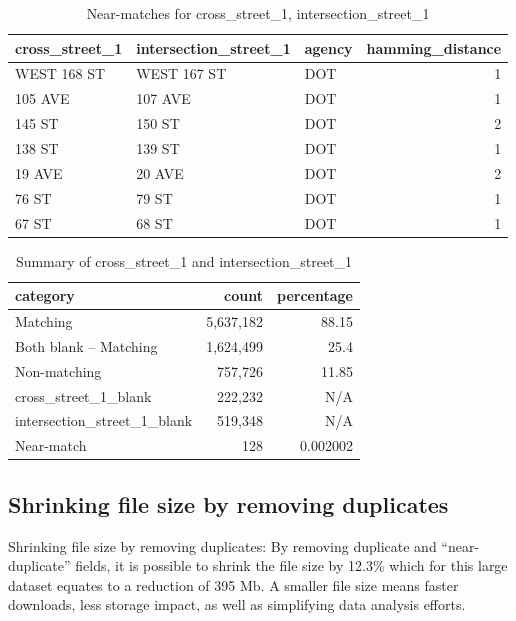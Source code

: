 \documentclass[12pt, titlepage]{article}
\begin{document}
\begin{table}[tbp]
    \centering
     \caption{Near-matches for cross\_street\_1, intersection\_street\_1}
     \label{tab:x1nearmatches}
		\begin{tabular}{l l l r}
	        \toprule
	        \textbf{cross\_street\_1} & \textbf{intersection\_street\_1} 
	        & \textbf{agency} & \textbf{hamming\_distance} \\
	        \midrule
	        WEST 168 ST    & WEST 167 ST           & DOT    & 1 \\
	        105 AVE        & 107 AVE               & DOT    & 1 \\
	        145 ST         & 150 ST                & DOT    & 2 \\
	        138 ST         & 139 ST                & DOT    & 1 \\
	        19 AVE         & 20 AVE                & DOT    & 2 \\
	        76 ST          & 79 ST                 & DOT    & 1 \\
	        67 ST          & 68 ST                 & DOT    & 1 \\
	        \bottomrule
	    \end{tabular}
\end{table}

\begin{table}[tbp]
    \centering
    \caption{Summary of cross\_street\_1 and intersection\_street\_1}
    \label{tab:summary1}
	    \begin{tabular}{l r r}
	        \toprule
	        \textbf{category} & \textbf{count} & \textbf{percentage} \\
	        \midrule
	        Matching                    & 5,637,182 & 88.15     \\
	        Both blank -- Matching      & 1,624,499 & 25.4      \\
	        Non-matching                &   757,726 & 11.85     \\
	        cross\_street\_1\_blank     &   222,232 & N/A       \\
	        intersection\_street\_1\_blank &   519,348 & N/A       \\
	        Near-match                  &       128 & 0.002002  \\
	        \bottomrule
	    \end{tabular}
\end{table}


\subsection{Shrinking file size by removing duplicates}
 \label{sec:filesize}
Shrinking file size by removing duplicates: By removing duplicate 
and ``near-duplicate'' fields, it is possible to 
shrink the file size by 12.3\% which for this large dataset equates to a 
reduction of 395 Mb. A smaller file size means faster downloads, 
less storage impact, as well as simplifying data analysis efforts.  
 
\end{document}
